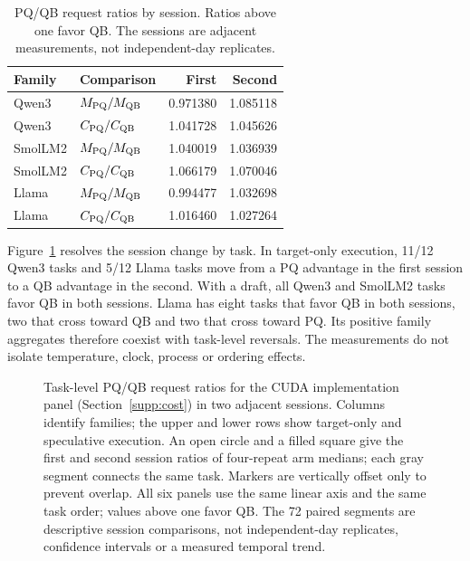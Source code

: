 \begin{table}[t]\centering\small
\caption{PQ/QB request ratios by session. Ratios above one favor QB. The sessions are adjacent measurements, not independent-day replicates.}
\label{tab:sessions}
\begin{tabular}{@{}llrr@{}}\toprule
Family & Comparison & First & Second\\\midrule
Qwen3 & $M_{\mathrm{PQ}}/M_{\mathrm{QB}}$ & 0.971380 & 1.085118 \\
Qwen3 & $C_{\mathrm{PQ}}/C_{\mathrm{QB}}$ & 1.041728 & 1.045626 \\\addlinespace[2pt]
SmolLM2 & $M_{\mathrm{PQ}}/M_{\mathrm{QB}}$ & 1.040019 & 1.036939 \\
SmolLM2 & $C_{\mathrm{PQ}}/C_{\mathrm{QB}}$ & 1.066179 & 1.070046 \\\addlinespace[2pt]
Llama & $M_{\mathrm{PQ}}/M_{\mathrm{QB}}$ & 0.994477 & 1.032698 \\
Llama & $C_{\mathrm{PQ}}/C_{\mathrm{QB}}$ & 1.016460 & 1.027264 \\
\bottomrule\end{tabular}
\end{table}

Figure~\ref{fig:sessiontasks} resolves the session change by task. In target-only execution, 11/12 Qwen3 tasks and 5/12 Llama tasks move from a PQ advantage in the first session to a QB advantage in the second. With a draft, all Qwen3 and SmolLM2 tasks favor QB in both sessions. Llama has eight tasks that favor QB in both sessions, two that cross toward QB and two that cross toward PQ. Its positive family aggregates therefore coexist with task-level reversals. The measurements do not isolate temperature, clock, process or ordering effects.

\begin{figure}[t]
\centering
\caption{Task-level PQ/QB request ratios for the CUDA implementation panel (Section~\ref{supp:cost}) in two adjacent sessions. Columns identify families; the upper and lower rows show target-only and speculative execution. An open circle and a filled square give the first and second session ratios of four-repeat arm medians; each gray segment connects the same task. Markers are vertically offset only to prevent overlap. All six panels use the same linear axis and the same task order; values above one favor QB. The 72 paired segments are descriptive session comparisons, not independent-day replicates, confidence intervals or a measured temporal trend.}
\label{fig:sessiontasks}
\end{figure}

